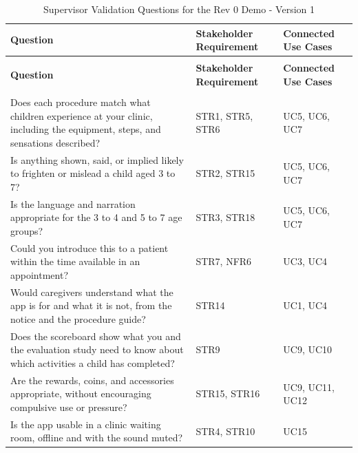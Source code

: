 \documentclass[10pt,titlepage]{article}
\begin{document}
\begin{longtable}{@{}>{\raggedright\arraybackslash}p{} >{\raggedright\arraybackslash}p{} >{\raggedright\arraybackslash}p{}@{}}
\caption{Supervisor Validation Questions for the Rev 0 Demo - Version 1}
\label{tab:ValidationQuestionsTable}\\

\toprule
\textbf{Question} & \textbf{Stakeholder Requirement} & \textbf{Connected Use Cases} \\
\midrule
\endfirsthead

\multicolumn{3}{c}{\tablename\ \thetable{} -- continued from previous page} \\
\toprule
\textbf{Question} & \textbf{Stakeholder Requirement} & \textbf{Connected Use Cases} \\
\midrule
\endhead

\midrule
\multicolumn{3}{r}{Continued on next page} \\
\endfoot

\bottomrule
\endlastfoot

Does each procedure match what children experience at your clinic, including the equipment, steps, and sensations described?
& STR1, STR5, STR6
& UC5, UC6, UC7 \\

Is anything shown, said, or implied likely to frighten or mislead a child aged 3 to 7?
& STR2, STR15
& UC5, UC6, UC7 \\

Is the language and narration appropriate for the 3 to 4 and 5 to 7 age groups?
& STR3, STR18
& UC5, UC6, UC7 \\

Could you introduce this to a patient within the time available in an appointment?
& STR7, NFR6
& UC3, UC4 \\

Would caregivers understand what the app is for and what it is not, from the notice and the procedure guide?
& STR14
& UC1, UC4 \\

Does the scoreboard show what you and the evaluation study need to know about which activities a child has completed?
& STR9
& UC9, UC10 \\

Are the rewards, coins, and accessories appropriate, without encouraging compulsive use or pressure?
& STR15, STR16
& UC9, UC11, UC12 \\

Is the app usable in a clinic waiting room, offline and with the sound muted?
& STR4, STR10
& UC15 \\

\end{longtable}
\end{document}
